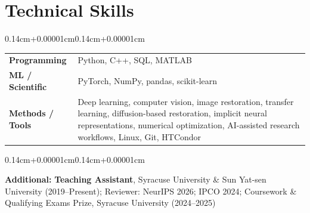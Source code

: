 \documentclass[10pt,letterpaper]{article}
\newenvironment{onecolentry}{\begin{adjustwidth}{0.14cm+0.00001cm}{0.14cm+0.00001cm}\raggedright}{\end{adjustwidth}}
\begin{document}
\section{Technical Skills}
\begin{onecolentry}
\begin{tabularx}{\linewidth}{@{}>{\bfseries}p{2.75cm} >{\raggedright\arraybackslash}X@{}}
  Programming & Python, C++, SQL, MATLAB \\[0.05cm]
  ML / Scientific & PyTorch, NumPy, pandas, scikit-learn \\[0.05cm]
  Methods / Tools & Deep learning, computer vision, image restoration, transfer learning, diffusion-based restoration, implicit neural representations, numerical optimization, AI-assisted research workflows, Linux, Git, HTCondor
\end{tabularx}
\end{onecolentry}

\vspace{0.16cm}
\begin{onecolentry}
{\fontsize{9.8pt}{11.2pt}\selectfont
\textbf{\color{primaryColor}Additional:} \textbf{Teaching Assistant}, Syracuse University \& Sun Yat-sen University (2019--Present); Reviewer: NeurIPS 2026; IPCO 2024; Coursework \& Qualifying Exams Prize, Syracuse University (2024--2025)
}
\end{onecolentry}
\end{document}
